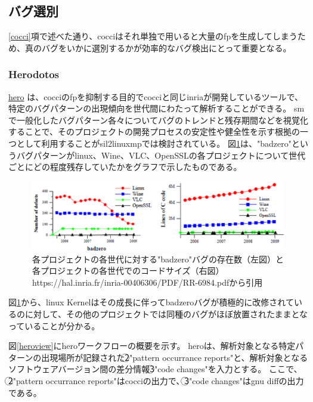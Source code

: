 \subsection{バグ選別}
\ref{cocci}項で述べた通り、\acrshort{cocci}はそれ単独で用いると大量の\acrshort{fp}を生成してしまうため、真のバグをいかに選別するかが効率的なバグ検出にとって重要となる。
\subsubsection{Herodotos}
\href{http://coccinelle.lip6.fr/herodotos/docs/herodotos.html}{\acrshort{hero}} \cite{hero}は、\acrshort{cocci}の\acrshort{fp}を抑制する目的で\acrshort{cocci}と同じ\acrshort{inria}が開発しているツールで、特定のバグパターンの出現傾向を世代間にわたって解析することができる。
\acrshort{sm}で一般化したバグパターン各々についてバグのトレンドと残存期間などを視覚化することで、そのプロジェクトの開発プロセスの安定性や健全性を示す根拠の一つとして利用することが\acrshort{sil2linuxmp}では検討されている。
図\ref{herograph}は、"badzero"というバグパターンが\acrshort{linux}、Wine、VLC、OpenSSLの各プロジェクトについて世代ごとにどの程度残存していたかをグラフで示したものである。
\begin{figure}[ht]
  \centering
  \includegraphics[width=\textwidth]{pic/herograph.eps}
  \caption{各プロジェクトの各世代に対する"badzero"バグの存在数（左図）と各プロジェクトの各世代でのコードサイズ（右図）　https://hal.inria.fr/inria-00406306/PDF/RR-6984.pdfから引用}
  \label{herograph}
\end{figure}
\par
図\ref{herograph}から、\acrshort{linux} Kernelはその成長に伴ってbadzeroバグが積極的に改修されているのに対して、その他のプロジェクトでは同種のバグがほぼ放置されたままとなっていることが分かる。
\par
図\ref{heroview}に\acrshort{hero}ワークフローの概要を示す。
\acrshort{hero}は、解析対象となる特定パターンの出現場所が記録された\textcircled{\scriptsize 2}"pattern occurrance reports"と、解析対象となるソフトウェアバージョン間の差分情報\textcircled{\scriptsize 3}"code changes"を入力とする。
ここで、\textcircled{\scriptsize 2}"pattern occurrance reports"は\acrshort{cocci}の出力で、\textcircled{\scriptsize 3}"code changes"は\acrshort{gnu} diffの出力である。
